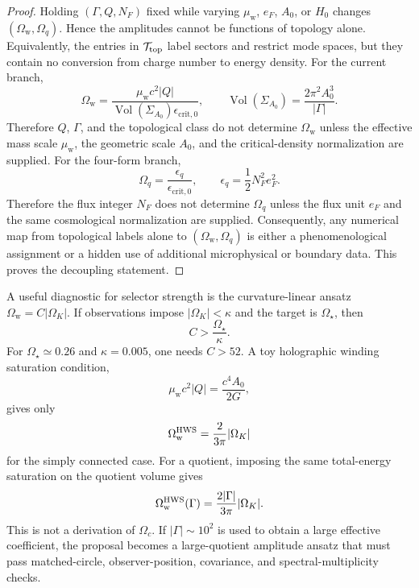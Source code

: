 \documentclass[
  aps,
  prd,
  reprint,
  superscriptaddress,
  floatfix,
  nofootinbib,
  longbibliography
]{revtex4-2}
\theoremstyle{plain}
\theoremstyle{definition}
\theoremstyle{remark}
\newcommand{\wind}{\mathrm w}
\newcommand{\crit}{\mathrm{crit}}
\newcommand{\Ow}{\Omega_{\mathrm w}}
\newcommand{\Oq}{\Omega_q}
\DeclareMathOperator{\Vol}{Vol}
\newcommand{\eps}{\epsilon}
\newcommand{\NF}{N_F}
\newcommand{\eF}{e_F}
\begin{document}
\begin{proof}
Holding \((\Gamma,Q,\NF)\) fixed while varying \(\mu_{\wind}\), \(\eF\),
\(A_0\), or \(H_0\) changes \((\Ow,\Oq)\).  Hence the amplitudes cannot be
functions of topology alone.  Equivalently, the entries in
\(\mathcal T_{\rm top}\) label sectors and restrict mode spaces, but they contain
no conversion from charge number to energy density.  For the current branch,
\begin{equation}
\Ow=
\frac{\mu_{\wind}c^2|Q|}{\Vol(\Sigma_{A_0})\eps_{\crit,0}},
\qquad
\Vol(\Sigma_{A_0})=\frac{2\pi^2A_0^3}{|\Gamma|} .
\label{eq:current_amp_decoupling_v12}
\end{equation}
Therefore \(Q\), \(\Gamma\), and the topological class do not determine
\(\Ow\) unless the effective mass scale \(\mu_{\wind}\), the geometric scale
\(A_0\), and the critical-density normalization are supplied.  For the
four-form branch,
\begin{equation}
\Oq=\frac{\eps_q}{\eps_{\crit,0}},
\qquad
\eps_q=\frac12\NF^2\eF^2 .
\label{eq:four_form_amp_decoupling_v12}
\end{equation}
Therefore the flux integer \(\NF\) does not determine \(\Oq\) unless the flux
unit \(\eF\) and the same cosmological normalization are supplied.
Consequently, any numerical map from topological labels alone to \((\Ow,\Oq)\)
is either a phenomenological assignment or a hidden use of additional
microphysical or boundary data.  This proves the decoupling statement.
\end{proof}

A useful diagnostic for selector strength is the curvature-linear ansatz
\(\Ow=C|\Omega_K|\).  If observations impose \(|\Omega_K|<\kappa\) and the
target is \(\Omega_\star\), then
\begin{equation}
C>\frac{\Omega_\star}{\kappa} .
\label{eq:selector_bound_v5}
\end{equation}
For \(\Omega_\star\simeq0.26\) and \(\kappa=0.005\), one needs \(C>52\).
A toy holographic winding saturation condition,
\begin{equation}
\mu_{\wind}c^2|Q|=\frac{c^4A_0}{2G},
\end{equation}
gives only
\begin{equation}
\Ow^{\rm HWS}=\frac{2}{3\pi}|\Omega_K|
\label{eq:hws_simple_v5}
\end{equation}
for the simply connected case.  For a quotient, imposing the same total-energy
saturation on the quotient volume gives
\begin{equation}
\Ow^{\rm HWS}(\Gamma)=\frac{2|\Gamma|}{3\pi}|\Omega_K| .
\label{eq:hws_quotient_v5}
\end{equation}
This is not a derivation of \(\Omega_c\).  If \(|\Gamma|\sim 10^2\) is used to
obtain a large effective coefficient, the proposal becomes a large-quotient
amplitude ansatz that must pass matched-circle, observer-position, covariance,
and spectral-multiplicity checks.
\end{document}
